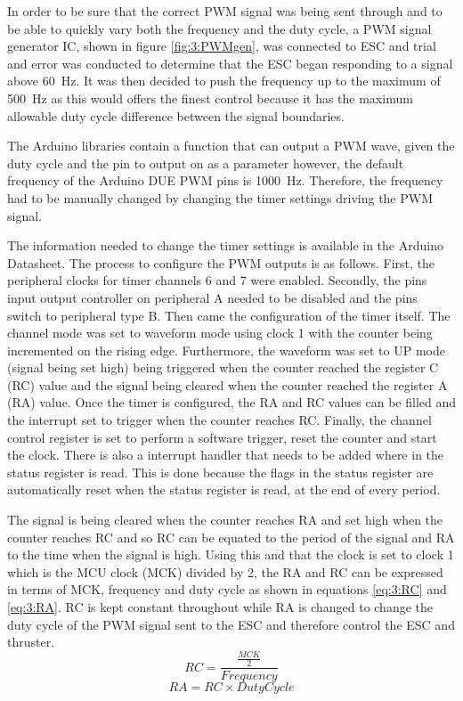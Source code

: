 	\vspace{0.4cm}
	In order to be sure that the correct PWM signal was being sent through and to be able to quickly vary both the frequency and the duty cycle, a PWM signal generator IC, shown in figure \ref{fig:3:PWMgen}, was connected to ESC and trial and error was conducted to determine that the ESC began responding to a signal above \SI{60}{\hertz}. It was then decided to push the frequency up to the maximum of \SI{500}{\hertz} as this would offers the finest control because it has the maximum allowable duty cycle difference between the signal boundaries.\par
	\vspace{0.4cm}
	The Arduino libraries contain a function that can output a PWM wave, given the duty cycle and the pin to output on as a parameter however, the default frequency of the Arduino DUE PWM pins is \SI{1000}{\hertz}. Therefore, the frequency had to be manually changed by changing the timer settings driving the PWM signal.\par
	\vspace{0.4cm}
	The information needed to change the timer settings is available in the Arduino Datasheet. The process to configure the PWM outputs is as follows. First, the peripheral clocks for timer channels 6 and 7 were enabled. Secondly, the pins input output controller on peripheral A needed to be disabled and the pins switch to peripheral type B. Then came the configuration of the timer itself. The channel mode was set to waveform mode using clock 1 with the counter being incremented on the rising edge. Furthermore, the waveform was set to UP mode (signal being set high) being triggered when the counter reached the register C (RC) value and the signal being cleared when the counter reached the register A (RA) value. Once the timer is configured, the RA and RC values can be filled and the interrupt set to trigger when the counter reaches RC. Finally, the channel control register is set to perform a software trigger, reset the counter and start the clock. There is also a interrupt handler that needs to be added where in the status register is read. This is done because the flags in the status register are automatically reset when the status register is read, at the end of every period.\par
	\vspace{0.4cm}
	The signal is being cleared when the counter reaches RA and set high when the counter reaches RC and so RC can be equated to the period of the signal and RA to the time when the signal is high. Using this and that the clock is set to clock 1 which is the MCU clock (MCK) divided by 2, the RA and RC can be expressed in terms of MCK, frequency and duty cycle as shown in equations \ref{eq:3:RC} and \ref{eq:3:RA}. RC is kept constant throughout while RA is changed to change the duty cycle of the PWM signal sent to the ESC and therefore control the ESC and thruster.
	\begin{equation}
		RC = \frac{\frac{MCK}{2}}{Frequency}
		\label{eq:3:RC}
	\end{equation}
	\begin{equation}
		RA = RC \times Duty Cycle
		\label{eq:3:RA}
	\end{equation}
